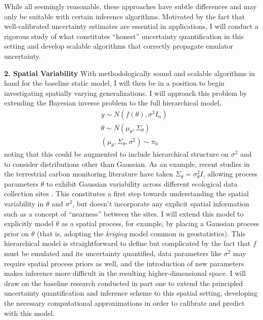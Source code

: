 \documentclass[12pt]{article}
\begin{document}
While all seemingly reasonable, these approaches have subtle differences and may only be suitable with certain inference algorithms. Motivated by the fact that well-calibrated uncertainty estimates are essential in applications, I will conduct a rigorous study of what constitutes ``honest'' uncertainty quantification in this setting and develop scalable algorithms that correctly propagate emulator uncertainty. 
 
 \textbf{2. Spatial Variability} With methodologically sound and scalable algorithms in hand for the baseline static model, I will then be in a position to begin investigating spatially varying generalizations. I will approach this problem by extending the Bayesian inverse problem to the full hierarchical model,
\begin{align*}
&y \sim N(f(\theta), \sigma^2 I_n) \\
&\theta \sim N(\mu_\theta, \Sigma_\theta) \\
&(\mu_\theta, \Sigma_\theta, \sigma^2) \sim \pi_0
\end{align*}
noting that this could be augmented to include hierarchical structure on $\sigma^2$ and to consider distributions other than Gaussian. As an example, recent studies in the terrestrial 
carbon monitoring literature have taken $\Sigma_\theta = \sigma^2_\theta I$, allowing process parameters $\theta$ to exhibit Gaussian variability across different ecological data collection
sites \cite{Fer2}. This constitutes a first step towards understanding the spatial variability in $\theta$ and $\sigma^2$, but doesn't incorporate any explicit spatial information such as a concept of ``nearness'' between the sites. I will extend this model to explicitly model $\theta$ as a spatial process, for example, by placing a Gaussian process prior on $\theta$ (that is, adopting the 
\textit{kriging} model common in geostatistics). This hierarchical model is straightforward to define
 but complicated by the fact that $f$ must be emulated and its uncertainty quantified, data parameters like $\sigma^2$ may require spatial process priors as well,
and the introduction of new parameters makes inference more difficult in the resulting higher-dimensional space.  I will draw on the baseline research conducted in part one to extend the principled uncertainty quantification and inference scheme to this spatial setting, developing the necessary computational approximations in order to calibrate and predict with this model. 
 
\end{document}

